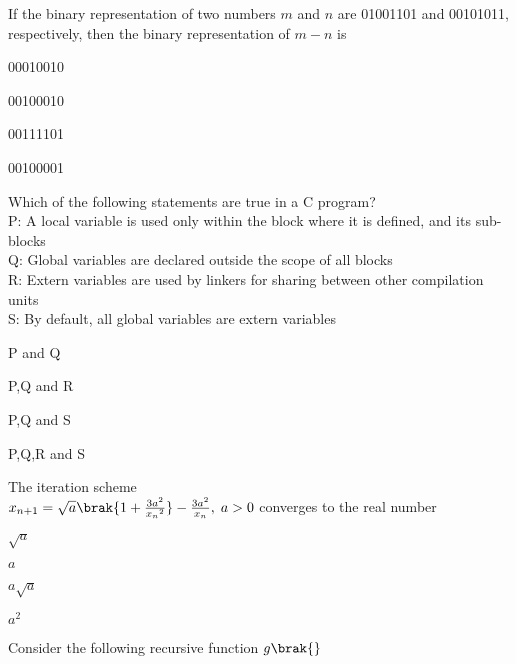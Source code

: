 \bigskip
\item If the binary representation of two numbers $m$ and $n$ are 01001101 and 00101011, respectively, then the binary representation of $m-n$ is 
\begin{enumerate}
    \begin{multicols}{4}
        \item 00010010
        \item 00100010
        \item 00111101
        \item 00100001
    \end{multicols}
\end{enumerate}
\bigskip
\item Which of the following statements are true in a C program?\\
P: A local variable is used only within the block where it is defined, and its sub-blocks\\
Q: Global variables are declared outside the scope of all blocks\\
R: Extern variables are used by linkers for sharing between other compilation units\\
S: By default, all global variables are extern variables
\begin{enumerate}
  \begin{multicols}{4}
        \item P and Q
        \item P,Q and R
        \item P,Q and S
        \item P,Q,R and S
    \end{multicols}
\end{enumerate}
\bigskip
\item The iteration scheme\\
$x_{n+1}=\sqrt{a}\brak{1+\frac{3a^2}{{x_n}^2}}-\frac{3a^2}{x_n},\; a>0$ converges to the real number
\begin{enumerate}
    \begin{multicols}{4}
        \item $\sqrt{a}$
        \item $a$
        \item $a\sqrt{a}$
        \item $a^2$
    \end{multicols}
\end{enumerate}
\bigskip
\item Consider the following recursive function $g\brak{}$
\lstset{language=[90]Fortran,
        basicstyle=\ttfamily,  %
        keywordstyle=\ttfamily,  %
        commentstyle=\ttfamily,  %
        numberstyle=\tiny,
        stepnumber=1,
        numbersep=5pt,
        showstringspaces=false,
        tabsize=4,
        breaklines=true,
        frame=none}  %

